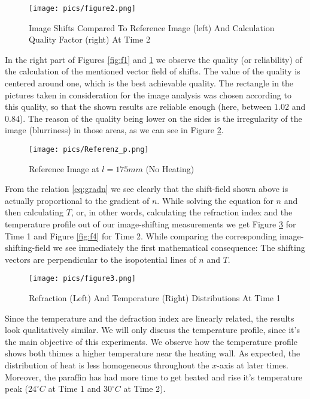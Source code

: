 \begin{figure}[H]
\centering
\texttt{[image: pics/figure2.png]}
\caption{Image Shifts Compared To Reference Image (left) And Calculation Quality Factor (right) At Time 2}
\label{fig:f2}
\end{figure}

In the right part of Figures \ref{fig:f1} and \ref{fig:f2} we observe the quality (or reliability) of the calculation of the mentioned vector field of shifts. The value of the quality is centered around one, which is the best achievable quality. The rectangle in the pictures taken in consideration for the image analysis was chosen according to this quality, so that the shown results are reliable enough (here, between $1.02$ and $0.84$). The reason of the quality being lower on the sides is the irregularity of the image (blurriness) in those areas, as we can see in Figure \ref{fig:refp}.

\begin{figure}[H]
\centering
\texttt{[image: pics/Referenz\_p.png]}
\caption{Reference Image at $l=175mm$ (No Heating)}
\label{fig:refp}
\end{figure}

From the relation \ref{eq:gradn} we see clearly that the shift-field shown above is actually proportional to the gradient of $n$. While solving the equation for $n$ and then calculating $T$, or, in other words, calculating the refraction index and the temperature profile out of our image-shifting measurements we get Figure \ref{fig:f3} for Time 1 and Figure \ref{fig:f4} for Time 2. While comparing the corresponding image-shifting-field we see immediately the first mathematical consequence: The shifting vectors are perpendicular to the isopotential lines of $n$ and $T$. 

\begin{figure}[H]
\centering
\texttt{[image: pics/figure3.png]}
\caption{Refraction (Left) And Temperature (Right) Distributions At Time 1}
\label{fig:f3}
\end{figure}

Since the temperature and the defraction index are linearly related, the results look qualitatively similar. We will only discuss the temperature profile, since it's the main objective of this experiments. We observe how the temperature profile shows both thimes a higher temperature near the heating wall. As expected, the distribution of heat is less homogeneous throughout the $x$-axis at later times. Moreover, the paraffin has had more time to get heated and rise it's temperature peak ($24^\circ C$ at Time 1 and $30^\circ C$ at Time 2).\\

